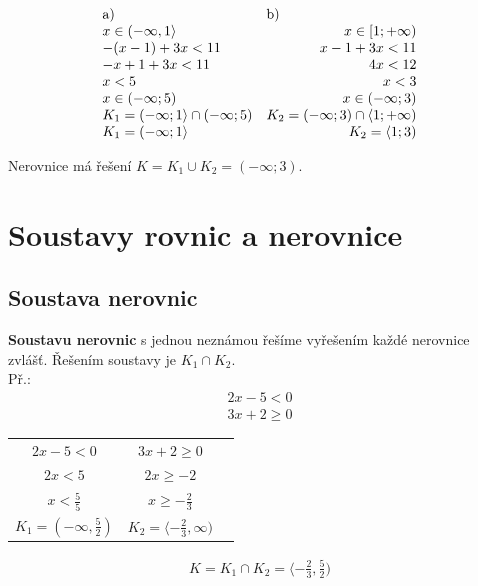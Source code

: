 \documentclass[12pt, a4paper]{article}
\begin{document}
\[
	\begin{array}{ll}
	\text{a)} & \text{b)}\\
	x \in (-\infty, 1 \rangle & \hfill x \in [1;+\infty)\\
	-(x-1) + 3x < 11 & \hfill x - 1 + 3x < 11\\
          -x + 1 + 3x < 11 & \hfill 4x < 12\\
          x < 5 & \hfill x < 3\\
	x \in (-\infty;5) & \hfill x \in (-\infty;3)\\
           K_1 = (-\infty; 1 \rangle \cap (-\infty;5) & \hfill K_2 = (-\infty;3) \cap \langle 1;+\infty)\\
           K_1 = (-\infty;1 \rangle & \hfill K_2 = \langle 1;3)
	\end{array}
\]
\begin{center}
Nerovnice má řešení $K = K_1 \cup K_2 = (-\infty; 3)$.\\
\end{center}

\pagebreak

\section{Soustavy rovnic a nerovnice}
\subsection*{Soustava nerovnic}
\textbf{Soustavu nerovnic} s jednou neznámou řešíme vyřešením každé nerovnice zvlášť. Řešením soustavy je $K_1 \cap K_2$.\\
Př.:\\
\[\begin{aligned}
2x - 5 < 0\\
3x + 2 \geq 0
\end{aligned}\]

\begin{center}
\begin{tabular}{ c c c }
$2x-5 < 0$ & $3x+2 \geq 0$\\
$2x < 5$ & $2x \geq -2$\\
$x < \frac{5}{5}$ & $x \geq -\frac{2}{3}$\\
$K_1 = (-\infty,\frac{5}{2})$ & $K_2 = \langle -\frac{2}{3}, \infty)$
\end{tabular}
\end{center}

\[
\begin{aligned} 
K = K_1 \cap K_2 = \langle - \frac{2}{3}, \frac{5}{2})
\end{aligned}
\]
\end{document}
